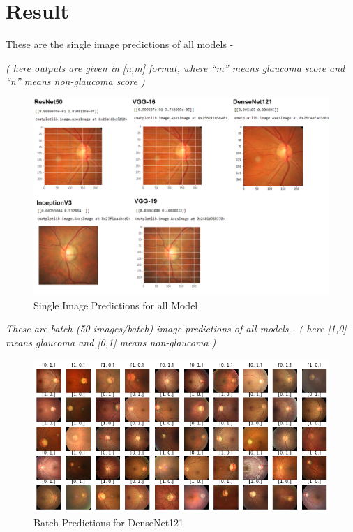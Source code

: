 \newpage
\section{Result}
These are the single image predictions of all models - 

\noindent\textit{( here outputs are given in [n,m] format, where “m” means glaucoma score and “n” means non-glaucoma score )}

\vspace{5mm}
\begin{figure}[hbt!]
\centering
\includegraphics[scale=0.6]{images/fig-53.png}
\caption{Single Image Predictions for all Model}
\label{fig:x Single Image Predictions for all Model}
\end{figure}

\newpage
\vspace{5mm}
\noindent\textit{These are batch (50 images/batch) image predictions of all models - ( here [1,0] means glaucoma and [0,1] means non-glaucoma )}


\vspace{5mm}
\begin{figure}[hbt!]
\centering
\includegraphics[scale=0.6]{images/fig-54.png}
\caption{Batch Predictions for DenseNet121}
\label{fig:x Batch Predictions for DenseNet121}
\end{figure}


